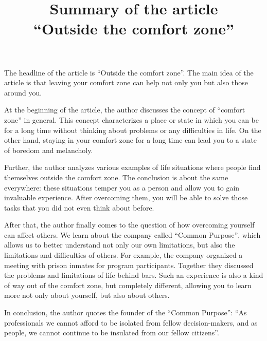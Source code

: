 \documentclass[a4paper]{article}
\title{Summary of the article\\``Outside the comfort zone''}
\begin{document}
	\maketitle
{}
\noindent The headline of the article is “Outside the comfort zone”. The main idea of the article is that leaving your comfort zone can help not only you but also those around you.

At the beginning of the article, the author discusses the concept of ``comfort zone'' in general. This concept characterizes a place or state in which you can be for a long time without thinking about problems or any difficulties in life. On the other hand, staying in your comfort zone for a long time can lead you to a state of boredom and melancholy.

Further, the author analyzes various examples of life situations where people find themselves outside the comfort zone. The conclusion is about the same everywhere: these situations temper you as a person and allow you to gain invaluable experience. After overcoming them, you will be able to solve those tasks that you did not even think about before.

After that, the author finally comes to the question of how overcoming yourself can affect others. We learn about the company called ``Common Purpose'', which allows us to better understand not only our own limitations, but also the limitations and difficulties of others. For example, the company organized a meeting with prison inmates for program participants. Together they discussed the problems and limitations of life behind bars. Such an experience is also a kind of way out of the comfort zone, but completely different, allowing you to learn more not only about yourself, but also about others.

In conclusion, the author quotes the founder of the ``Common Purpose'': ``As professionals we cannot afford to be isolated from fellow decision-makers, and as people, we cannot continue to be insulated from our fellow citizens''.
\end{document}
